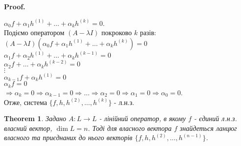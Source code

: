 \documentclass[a4paper, 10pt]{article}
\makeatletter
\def\qed{$\blacksquare$}
\theoremstyle{theoremdd}
\newtheorem{theorem}{Theorem}[subsection]
\theoremstyle{theoremdd}
\theoremstyle{theoremdd}
\theoremstyle{theoremdd}
\theoremstyle{theoremdd}
\theoremstyle{theoremdd}
\theoremstyle{theoremdd}
\theoremstyle{theoremdd}
\renewenvironment{proof}[1][Proof.\\]{\par
\pushQED{\hfill \qed}%
\normalfont \topsep6\p@\@plus6\p@\relax
\trivlist
\item\relax
{\bfseries
#1\@addpunct{.}}\hspace\labelsep\ignorespaces
}{%
\popQED\endtrivlist\@endpefalse
}
\makeatother
\begin{document}
\begin{proof}
$\alpha_0 f + \alpha_1 h^{(1)} + \dots + \alpha_k h^{(k)} = 0$.\\
Подіємо оператором $(A-\lambda I)$ покроково $k$ разів:\\
$(A-\lambda I)(\alpha_0 f + \alpha_1 h^{(1)} + \dots + \alpha_k h^{(k)}) = 0$\\
$\alpha_1 f + \alpha_2 h^{(1)} + \dots + \alpha_k h^{(k-1)} = 0$\\
$\alpha_2 f + \dots + \alpha_k h^{(k-2)} = 0$\\
$\vdots$\\
$\alpha_{k-1} f + \alpha_k h^{(1)} = 0$\\
$\alpha_k f = 0$\\
$\Rightarrow \alpha_k = 0 \Rightarrow \alpha_{k-1} = 0 \Rightarrow \dots \Rightarrow \alpha_2 = 0 \Rightarrow \alpha_1 = 0 \Rightarrow \alpha_0 = 0$.\\
Отже, система $\{f,h,h^{(2)},\dots,h^{(k)}\}$ - л.н.з.
\end{proof}

\begin{theorem}
Задано $A: L \to L$ - лінійний оператор, в якому $f$ - єдиний л.н.з. власний вектор, $\dim L = n$. Тоді для власного вектора $f$ знайдеться ланцюг власного та приєднаних до нього векторів $\{f,h,h^{(2)},\dots,h^{(n-1)}\}$.
\end{theorem}
\end{document}
